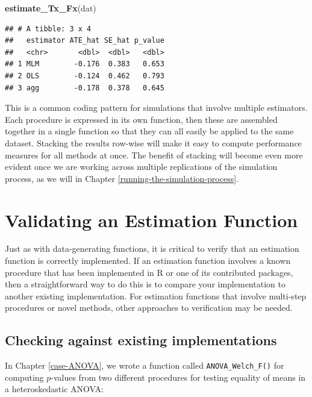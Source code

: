 \documentclass[
]{book}
\newenvironment{Shaded}{\begin{snugshade}}{\end{snugshade}}
\newcommand{\FunctionTok}[1]{\textcolor[rgb]{0.13,0.29,0.53}{\textbf{#1}}}
\newcommand{\NormalTok}[1]{#1}
\begin{document}
\begin{Shaded}
\begin{Highlighting}[]
\FunctionTok{estimate\_Tx\_Fx}\NormalTok{(dat)}
\end{Highlighting}
\end{Shaded}

\begin{verbatim}
## # A tibble: 3 x 4
##   estimator ATE_hat SE_hat p_value
##   <chr>       <dbl>  <dbl>   <dbl>
## 1 MLM        -0.176  0.383   0.653
## 2 OLS        -0.124  0.462   0.793
## 3 agg        -0.178  0.378   0.645
\end{verbatim}

This is a common coding pattern for simulations that involve multiple estimators.
Each procedure is expressed in its own function, then these are assembled together in a single function so that they can all easily be applied to the same dataset.
Stacking the results row-wise will make it easy to compute performance measures for all methods at once.
The benefit of stacking will become even more evident once we are working across multiple replications of the simulation process, as we will in Chapter \ref{running-the-simulation-process}.

\section{Validating an Estimation Function}\label{validating-estimation-function}

Just as with data-generating functions, it is critical to verify that an estimation function is correctly implemented.
If an estimation function involves a known procedure that has been implemented in R or one of its contributed packages, then a straightforward way to do this is to compare your implementation to another existing implementation.
For estimation functions that involve multi-step procedures or novel methods, other approaches to verification may be needed.

\subsection{Checking against existing implementations}\label{checking-against-existing-implementations}

In Chapter \ref{case-ANOVA}, we wrote a function called \texttt{ANOVA\_Welch\_F()} for computing \(p\)-values from two different procedures for testing equality of means in a heteroskedastic ANOVA:
\end{document}
